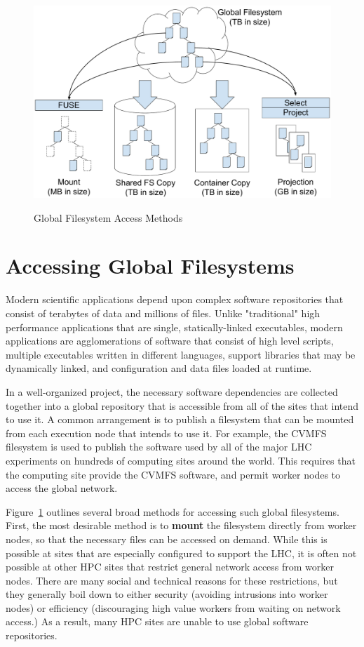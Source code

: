 \documentclass[sigconf]{acmart}
\begin{document}
\fi

\begin{figure}
\includegraphics[width=\linewidth]{drawings/methods.pdf}
\label{choices}
\caption{Global Filesystem Access Methods}
\end{figure}

\section{Accessing Global Filesystems}

Modern scientific applications depend upon complex software
repositories that consist of terabytes of data and millions of files.
Unlike "traditional" high performance applications that are
single, statically-linked executables, modern applications are
agglomerations of software that consist of high level scripts,
multiple executables written in different languages, support
libraries that may be dynamically linked, and configuration and
data files loaded at runtime.

In a well-organized project, the necessary software dependencies
are collected together into a global repository that is accessible
from all of the sites that intend to use it.  A common arrangement
is to publish a filesystem that can be mounted from each execution node that intends to use it.  For example, the CVMFS~\cite{globalfs-cise-2015} filesystem is used to publish the software used by all of the major LHC
experiments on hundreds of computing sites around the world.
This requires that the computing site provide the CVMFS software,
and permit worker nodes to access the global network.

Figure~\ref{choices} outlines several broad methods for
accessing such global filesystems.  First, the most desirable
method is to {\bf mount} the filesystem directly from worker
nodes, so that the necessary files can be accessed on demand.
While this is possible at sites that are especially configured
to support the LHC, it is often not possible at other HPC sites
that restrict general network access from worker nodes.
There are many social and technical reasons for these restrictions, but they generally boil down to either security (avoiding intrusions into worker nodes) or efficiency (discouraging high value workers from waiting on network access.)  As a result, many HPC sites are unable
to use global software repositories.
\end{document}
